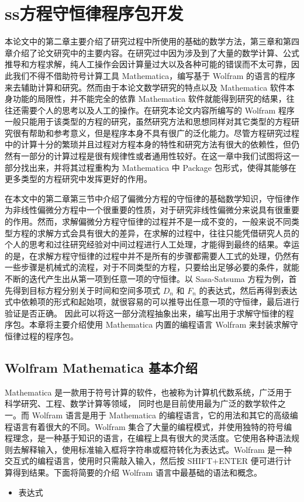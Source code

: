 
\chapter{ss方程守恒律程序包开发}
本论文中的第二章主要介绍了研究过程中所使用的基础的数学方法，第三章和第四章介绍了论文研究中的主要内容。在研究过中因为涉及到了大量的数学计算、公式推导和方程求解，纯人工操作会因计算量过大以及各种可能的错误而不太可靠，因此我们不得不借助符号计算工具 Mathematica，编写基于 Wolfram 的语言的程序来去辅助计算和研究。然而由于本论文数学研究的特点以及 Mathematica 软件本身功能的局限性，并不能完全的依靠 Mathematica 软件就能得到研究的结果，往往还需要个人的思考以及人工的操作。在研究本论文内容所编写的 Wolfram 程序一般只能用于该类型的方程的研究，虽然研究方法和思想同样对其它类型的方程研究很有帮助和参考意义，但是程序本身不具有很广的泛化能力。尽管方程研究过程中的计算十分的繁琐并且过程对方程本身的特性和研究方法有很大的依赖性，但仍然有一部分的计算过程是很有规律性或者通用性较好。在这一章中我们试图将这一部分找出来，并将其过程重构为 Mathematica 中 Package 包形式，使得其能够在更多类型的方程研究中发挥更好的作用。

在本文中的第二章第三节中介绍了偏微分方程的守恒律的基础数学知识，守恒律作为非线性偏微分方程中一个很重要的性质，对于研究非线性偏微分来说具有很重要的作用。然而，求解偏微分方程守恒律的过程并不是一成不变的，一般来说不同类型方程的求解方式会具有很大的差异，在求解的过程中，往往只能凭借研究人员的个人的思考和过往研究经验对中间过程进行人工处理，才能得到最终的结果。幸运的是，在求解方程守恒律的过程中并不是所有的步骤都需要人工式的处理，仍然有一些步骤是机械式的流程，对于不同类型的方程，只要给出足够必要的条件，就能不断的迭代产生出从第一项到任意一项的守恒律。以 Sasa-Satsuma 方程为例，首先得到目标方程分别关于时间和空间多项式 $D_n$ 和 $F_n$ 的表达式，然后再得到表达式中依赖项的形式和起始项，就很容易的可以推导出任意一项的守恒律，最后进行验证是否正确。 因此可以将这一部分流程抽象出来，编写出用于求解守恒律的程序包。本章将主要介绍使用 Mathematica 内置的编程语言 Wolfram 来封装求解守恒律过程的程序包。

\section{Wolfram Mathematica 基本介绍}
Mathematica 是一款用于符号计算的软件，也被称为计算机代数系统，广泛用于科学研究、工程、数学计算等领域， 同时也是目前使用最为广泛的数学软件之一。而 Wolfram 语言是用于 Mathematica 的编程语言，它的用法和其它的高级编程语言有着很大的不同。Wolfram 集合了大量的编程模式，并使用独特的符号编程理念，是一种基于知识的语言，在编程上具有很大的灵活度。它使用各种语法规则去解释输入，使用标准输入框将字符串或框符转化为表达式。Wolfram 是一种交互式的编程语言，使用时只需敲入输入，然后按 SHIFT+ENTER 便可进行计算得到结果。下面将简要的介绍 Wolfram 语言中最基础的语法和概念。
\begin{itemize}
    \item 表达式
\end{itemize}

